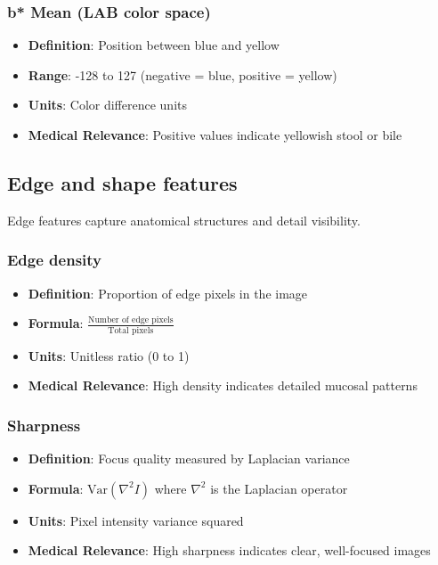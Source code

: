 \documentclass[11pt]{article}
\begin{document}
\subsubsection{b* Mean (LAB color space)}
\begin{itemize}
    \item \textbf{Definition}: Position between blue and yellow
    \item \textbf{Range}: -128 to 127 (negative = blue, positive = yellow)
    \item \textbf{Units}: Color difference units
    \item \textbf{Medical Relevance}: Positive values indicate yellowish stool or bile
\end{itemize}

\subsection{Edge and shape features}

Edge features capture anatomical structures and detail visibility.

\subsubsection{Edge density}
\begin{itemize}
    \item \textbf{Definition}: Proportion of edge pixels in the image
    \item \textbf{Formula}: $\displaystyle \frac{\text{Number of edge pixels}}{\text{Total pixels}}$
    \item \textbf{Units}: Unitless ratio (0 to 1)
    \item \textbf{Medical Relevance}: High density indicates detailed mucosal patterns
\end{itemize}

\subsubsection{Sharpness}
\begin{itemize}
    \item \textbf{Definition}: Focus quality measured by Laplacian variance
    \item \textbf{Formula}: $\text{Var}(\nabla^2 I)$ where $\nabla^2$ is the Laplacian operator
    \item \textbf{Units}: Pixel intensity variance squared
    \item \textbf{Medical Relevance}: High sharpness indicates clear, well-focused images
\end{itemize}
\end{document}
